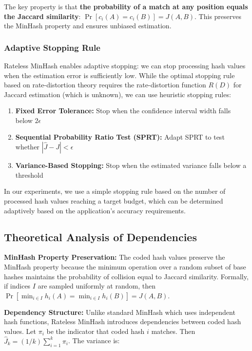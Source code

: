 \documentclass[11pt,letterpaper]{article}
\begin{document}
The key property is that \textbf{the probability of a match at any position equals the Jaccard similarity}: $\Pr[c_i(A) = c_i(B)] = J(A,B)$. This preserves the MinHash property and ensures unbiased estimation.

\subsubsection{Adaptive Stopping Rule}

Rateless MinHash enables adaptive stopping: we can stop processing hash values when the estimation error is sufficiently low. While the optimal stopping rule based on rate-distortion theory requires the rate-distortion function $R(D)$ for Jaccard estimation (which is unknown), we can use heuristic stopping rules:

\begin{enumerate}
    \item \textbf{Fixed Error Tolerance:} Stop when the confidence interval width falls below $2\epsilon$
    \item \textbf{Sequential Probability Ratio Test (SPRT):} Adapt SPRT to test whether $|\hat{J} - J| < \epsilon$
    \item \textbf{Variance-Based Stopping:} Stop when the estimated variance falls below a threshold
\end{enumerate}

In our experiments, we use a simple stopping rule based on the number of processed hash values reaching a target budget, which can be determined adaptively based on the application's accuracy requirements.

\subsection{Theoretical Analysis of Dependencies}

\textbf{MinHash Property Preservation:} The coded hash values preserve the MinHash property because the minimum operation over a random subset of base hashes maintains the probability of collision equal to Jaccard similarity. Formally, if indices $I$ are sampled uniformly at random, then $\Pr[\min_{i \in I} h_i(A) = \min_{i \in I} h_i(B)] = J(A,B)$.

\textbf{Dependency Structure:} Unlike standard MinHash which uses independent hash functions, Rateless MinHash introduces dependencies between coded hash values. Let $\pi_i$ be the indicator that coded hash $i$ matches. Then $\hat{J}_k = (1/k) \sum_{i=1}^k \pi_i$. The variance is:
\end{document}
